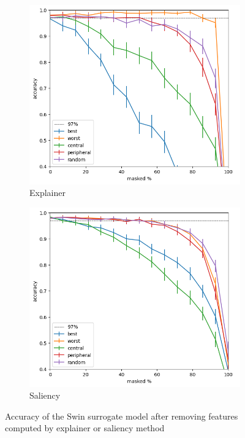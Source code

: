 \documentclass[magisterska,en]{pracamgr}
\begin{document}
\begin{figure}
\centering
\begin{subfigure}{.7\textwidth}
  \centering
  \includegraphics[width=.8\linewidth]{./images/masking_explainer_patches_accuracy_swin_half-0.png}
  \caption{Explainer}
  \label{fig:sub1}
\end{subfigure}%
\begin{subfigure}{.7\textwidth}
  \centering
  \includegraphics[width=.8\linewidth]
{./images/masking_saliency_patches_accuracy_swin_half-0.png}
  \caption{Saliency}
  \label{fig:sub2}
\end{subfigure}
\caption{Accuracy of the Swin surrogate model after removing features computed by explainer or saliency method}
\label{fig:Swin_Saliency_Explainer_CIFAR}
\end{figure}
\end{document}
